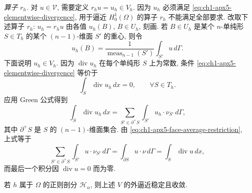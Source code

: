 \emph{算子 $r_h$.} 对 $u\in\mathcal V$, 需要定义 $r_hu=u_h\in V_h$. 因为 $u_h$ 必须满足 \eqref{eq:ch1-apx5-elementwise-divergence}, 用于逼近 $H_0^1(\Omega)$ 的算子 $r_h$ 不能满足全部要求. 改取下述算子 $r_h$: $u_h=r_hu$ 由各值 $u_h(B)$, $B\in U_h$, 刻画. 若 $B\in U_h$ 是某个 $n$-单纯形 $S\in T_h$ 的某个 $(n-1)$-维面 $S'$ 的重心, 则令
\begin{equation}
u_h(B)=\frac1{\operatorname{meas}_{n-1}(S')}
\int_{S'}u\,d\Gamma.
\label{eq:ch1-apx5-face-average-restriction}
\end{equation}
下面说明 $u_h\in V_h$. 因为 $\operatorname{div}u_h$ 在每个单纯形 $S$ 上为常数, 条件 \eqref{eq:ch1-apx5-elementwise-divergence} 等价于
\[
\int_S\operatorname{div}u_h\,dx=0,
\qquad\forall S\in T_h.
\]
应用 Green 公式得到
\[
\int_S\operatorname{div}u_h\,dx
=\sum_{S'\in\partial^+S}\int_{S'}u_h\cdot\nu_{S'}\,d\Gamma,
\]
其中 $\partial^+S$ 是 $S$ 的 $(n-1)$-维面集合. 由 \eqref{eq:ch1-apx5-face-average-restriction}, 上式等于
\[
\sum_{S'\in\partial^+S}\int_{S'}u\cdot\nu_{S'}\,d\Gamma
=\int_{\partial S}u\cdot\nu\,d\Gamma
=\int_S\operatorname{div}u\,dx,
\]
而最后一个积分因 $\operatorname{div}u=0$ 而为零.

\begin{Proposition}
\label{prop:ch1-apx5-v-stable-convergent}
若 $h$ 属于 $\Omega$ 的正则剖分 $\mathcal H_\alpha$, 则上述 $V$ 的外逼近稳定且收敛.
\end{Proposition}

